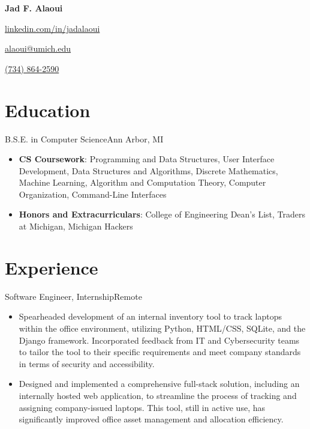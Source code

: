 \documentclass[letterpaper,10.5pt]{article}
\begin{document}
\begin{center}
    \Huge{\textbf{Jad F. Alaoui}}

    \begin{itemize*}
        \item[] \href{https://linkedin.com/in/jadalaoui}{linkedin.com/in/jadalaoui}
        \item \href{mailto:alaoui@umich.edu}{alaoui@umich.edu}
        \item \href{tel:+17348642590}{(734) 864-2590}
    \end{itemize*}
\end{center}

\section{Education}
{B.S.E. in Computer Science}{Ann Arbor, MI}
\begin{itemize}
    \item \textbf{CS Coursework}: Programming and Data Structures, User Interface Development, Data Structures and Algorithms, Discrete Mathematics, Machine
          Learning, Algorithm and Computation Theory, Computer Organization, Command-Line Interfaces
    \item \textbf{Honors and Extracurriculars}: College of Engineering Dean's List, Traders at Michigan, Michigan Hackers
\end{itemize}

\section{Experience}
{Software Engineer, Internship}{Remote}
\begin{itemize}
    \item Spearheaded development of an internal inventory tool to track laptops within the office environment, utilizing Python, HTML/CSS, SQLite, and the Django framework. Incorporated feedback from IT and Cybersecurity teams to tailor the tool to their specific requirements and meet company standards in terms of security and accessibility.
    
    \item Designed and implemented a comprehensive full-stack solution, including an internally hosted web application, to streamline the process of tracking and assigning company-issued laptops. This tool, still in active use, has significantly improved office asset management and allocation efficiency.
\end{itemize}
\end{document}
